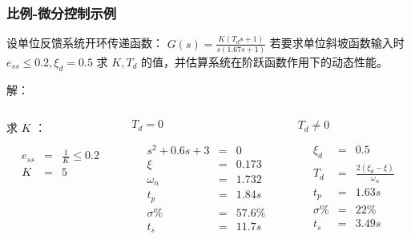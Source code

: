 \documentclass{beamer}
\begin{document}
\begin{frame}
\frametitle{比例-微分控制示例}
\label{sec-2-8}

设单位反馈系统开环传递函数： $G(s)=\frac{K(T_d s+1)}{s(1.67s+1)}$
若要求单位斜坡函数输入时 $e_{ss}\leq 0.2, \xi_d=0.5$ 求
$K,T_d$ 的值，并估算系统在阶跃函数作用下的动态性能。

解：
\begin{columns}
\begin{column}{0.3\textwidth}
\begin{block}{求 $K$ ：}
\label{sec-2-8-1}

\begin{eqnarray*}
e_{ss} & =& \frac{1}{K} \leq 0.2\\
 K &=& 5 
\end{eqnarray*}
\end{block}
\end{column}
\begin{column}{0.4\textwidth}
\begin{block}{$T_d=0$}
\label{sec-2-8-2}

\begin{eqnarray*}
s^2+0.6s+3 & =& 0\\
\xi &=& 0.173 \\
\omega_n &=& 1.732 \\
t_p &=& 1.84s \\
\sigma\% &=& 57.6\% \\
t_s &=& 11.7s
\end{eqnarray*}
\end{block}
\end{column}
\begin{column}{0.3\textwidth}
\begin{block}{$T_d\neq0$}
\label{sec-2-8-3}

\begin{eqnarray*}
\xi_d & =& 0.5\\
T_d &=& \frac{2(\xi_d-\xi)}{\omega_n}\\
t_p &=& 1.63s \\
\sigma\% &=& 22\% \\
t_s &=& 3.49s
\end{eqnarray*}
\end{block}
\end{column}
\end{columns}
\end{frame}
\end{document}
